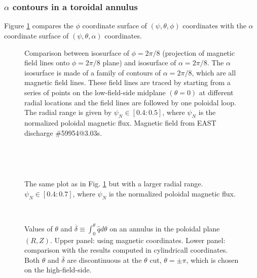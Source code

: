 \documentclass{llncs}
\begin{document}
\

\

\subsubsection{$\alpha$ contours in a toroidal annulus}

Figure \ref{17-9-18-1} compares the $\phi$ coordinate surface of $(\psi,
\theta, \phi)$ coordinates with the $\alpha$ coordinate surface of $(\psi,
\theta, \alpha)$ coordinates.

\begin{figure}[h]
  \caption{\label{17-9-18-1}Comparison between isosurface of $\phi = 2 \pi /
  8$ (projection of magnetic field lines onto $\phi = 2 \pi / 8$ plane) and
  isosurface of $\alpha = 2 \pi / 8$. The $\alpha$ isosurface is made of a
  family of contours of $\alpha = 2 \pi / 8$, which are all magnetic field
  lines. These field lines are traced by starting from a series of points on
  the low-field-side midplane $(\theta = 0)$ at different radial locations and
  the field lines are followed by one poloidal loop. The radial range is given
  by $\psi_N \in [0.4 : 0.5]$, where $\psi_N$ is the normalized poloidal
  magnetic flux. Magnetic field from EAST discharge \#59954@3.03s.}
\end{figure}

\

\

\begin{figure}[h]
  \caption{The same plot as in Fig. \ref{17-9-18-1} but with a larger radial
  range. $\psi_N \in [0.4 : 0.7]$, where $\psi_N$ is the normalized poloidal
  magnetic flux.}
\end{figure}

\begin{figure}[h]
  
  
  \
  \caption{Values of $\theta$ and $\overline{\delta} \equiv \int_0^{\theta}
  \hat{q} d \theta$ on an annulus in the poloidal plane $(R, Z)$. Upper panel:
  using magnetic coordinates. Lower panel: comparison with the results
  computed in cylindricall coordinates. Both $\theta$ and $\overline{\delta}$
  are discontinuous at the $\theta$ cut, $\theta = \pm \pi$, which is chosen
  on the high-field-side.}
\end{figure}
\end{document}
